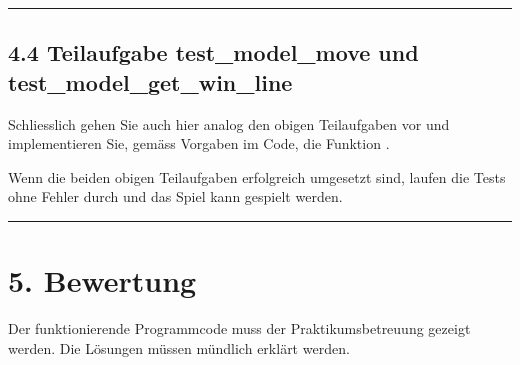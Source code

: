 \documentclass[a4paper,10pt,english]{report}
\begin{document}
\bigskip\hrule\bigskip



\subsection{4.4 Teilaufgabe test\_model\_move und test\_model\_get\_win\_line}
\label{\detokenize{P05_TicTacToe/README:teilaufgabe-test-model-move-und-test-model-get-win-line}}
\sphinxAtStartPar
Schliesslich gehen Sie auch hier analog den obigen Teilaufgaben vor und implementieren Sie, gemäss Vorgaben im Code, die Funktion .

\begin{sphinxVerbatim}[commandchars=\\\{\}]
       






\end{sphinxVerbatim}

\sphinxAtStartPar
Wenn die beiden obigen Teilaufgaben erfolgreich umgesetzt sind, laufen die Tests ohne Fehler durch und das Spiel kann gespielt werden.


\bigskip\hrule\bigskip



\section{5. Bewertung}
\label{\detokenize{P05_TicTacToe/README:bewertung}}
\sphinxAtStartPar
Der funktionierende Programmcode muss der Praktikumsbetreuung gezeigt werden. Die Lösungen müssen mündlich erklärt werden.
\end{document}
